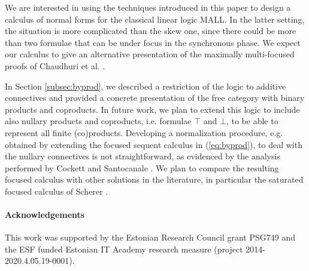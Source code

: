 \documentclass[submission,copyright,creativecommons]{eptcs}
\theoremstyle{definition}
\begin{document}
We are interested in using the techniques introduced in this paper to design a calculus of normal forms for the classical linear logic MALL.
In the latter setting, the situation is more complicated than the skew one, since there could be more than two formulae that can be under focus in the synchronous phase.
We expect our calculus to give an alternative presentation of the maximally multi-focused proofs of Chaudhuri et al. \cite{chaudhuri:canonical:2008}.

In Section \ref{subsec:byprod}, we described a restriction of the logic to additive connectives and provided a concrete presentation of the free category with binary products and coproducts. In future work, we plan to extend this logic to include also nullary products and coproducts, i.e. formulae $\top$ and $\bot$, to be able to represent all finite (co)products. Developing a normalization procedure, e.g. obtained by extending the focused sequent calculus in (\ref{eq:byprod}), to deal with the nullary connectives is not straightforward, as evidenced by the analysis performed by Cockett and Santocanale \cite{CS09}. We plan to compare the resulting focused calculus with other solutions in the literature, in particular the saturated focused calculus of Scherer \cite{Scherer17}.


\paragraph{Acknowledgements}
This work was supported by the Estonian Research Council grant PSG749 and the ESF funded Estonian IT Academy research measure (project 2014-2020.4.05.19-0001). 

  
  
\end{document}
